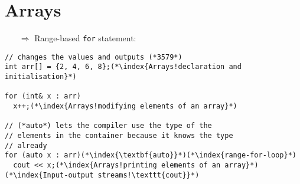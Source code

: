 \documentclass[10pt]{article}
\begin{document}
\section{Arrays}
\small
\begin{enumerate}
\item[$\Rightarrow$] Range-based \texttt{for} statement:
\end{enumerate}
\begin{lstlisting}
// changes the values and outputs (*3579*)
int arr[] = {2, 4, 6, 8};(*\index{Arrays!declaration and initialisation}*)

for (int& x : arr)
  x++;(*\index{Arrays!modifying elements of an array}*)

// (*auto*) lets the compiler use the type of the 
// elements in the container because it knows the type
// already
for (auto x : arr)(*\index{\textbf{auto}}*)(*\index{range-for-loop}*)
  cout << x;(*\index{Arrays!printing elements of an array}*)(*\index{Input-output streams!\texttt{cout}}*)
\end{lstlisting}
%
%
\end{document}
